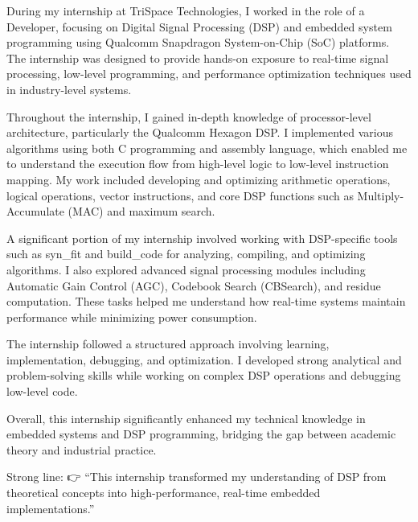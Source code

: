 \documentclass[12pt,a4paper]{report}
\begin{document}
\vspace{0.5cm}
\setlength{\parindent}{1.5em}

During my internship at TriSpace Technologies, I worked in the role of a Developer, focusing on Digital Signal Processing (DSP) and embedded system programming using Qualcomm Snapdragon System-on-Chip (SoC) platforms. The internship was designed to provide hands-on exposure to real-time signal processing, low-level programming, and performance optimization techniques used in industry-level systems.


Throughout the internship, I gained in-depth knowledge of processor-level architecture, particularly the Qualcomm Hexagon DSP. I implemented various algorithms using both C programming and assembly language, which enabled me to understand the execution flow from high-level logic to low-level instruction mapping. My work included developing and optimizing arithmetic operations, logical operations, vector instructions, and core DSP functions such as Multiply-Accumulate (MAC) and maximum search.


A significant portion of my internship involved working with DSP-specific tools such as syn\_fit and build\_code for analyzing, compiling, and optimizing algorithms. I also explored advanced signal processing modules including Automatic Gain Control (AGC), Codebook Search (CBSearch), and residue computation. These tasks helped me understand how real-time systems maintain performance while minimizing power consumption.


The internship followed a structured approach involving learning, implementation, debugging, and optimization. I developed strong analytical and problem-solving skills while working on complex DSP operations and debugging low-level code.


Overall, this internship significantly enhanced my technical knowledge in embedded systems and DSP programming, bridging the gap between academic theory and industrial practice.


Strong line: 👉 “This internship transformed my understanding of DSP from theoretical concepts into high-performance, real-time embedded implementations.”


\newpage
\tableofcontents

\newpage
\listoffigures
\end{document}
